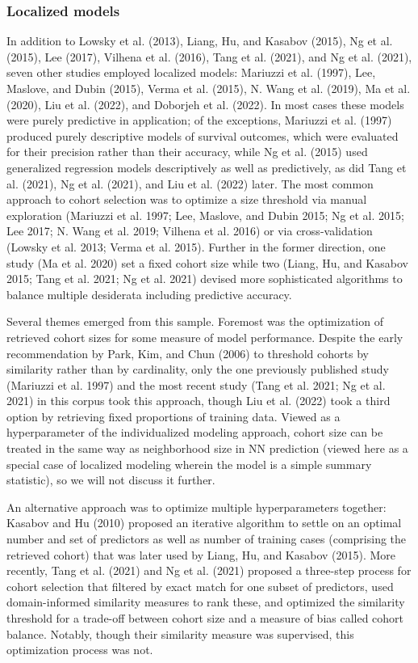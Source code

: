 \documentclass{article}
\begin{document}
\hypertarget{localized-models}{%
\subsubsection{Localized models}\label{localized-models}}

In addition to Lowsky et al. (2013), Liang, Hu, and Kasabov (2015), Ng
et al. (2015), Lee (2017), Vilhena et al. (2016), Tang et al. (2021),
and Ng et al. (2021), seven other studies employed localized models:
Mariuzzi et al. (1997), Lee, Maslove, and Dubin (2015), Verma et al.
(2015), N. Wang et al. (2019), Ma et al. (2020), Liu et al. (2022), and
Doborjeh et al. (2022). In most cases these models were purely
predictive in application; of the exceptions, Mariuzzi et al. (1997)
produced purely descriptive models of survival outcomes, which were
evaluated for their precision rather than their accuracy, while Ng et
al. (2015) used generalized regression models descriptively as well as
predictively, as did Tang et al. (2021), Ng et al. (2021), and Liu et
al. (2022) later. The most common approach to cohort selection was to
optimize a size threshold via manual exploration (Mariuzzi et al. 1997;
Lee, Maslove, and Dubin 2015; Ng et al. 2015; Lee 2017; N. Wang et al.
2019; Vilhena et al. 2016) or via cross-validation (Lowsky et al. 2013;
Verma et al. 2015). Further in the former direction, one study (Ma et
al. 2020) set a fixed cohort size while two (Liang, Hu, and Kasabov
2015; Tang et al. 2021; Ng et al. 2021) devised more sophisticated
algorithms to balance multiple desiderata including predictive accuracy.

Several themes emerged from this sample. Foremost was the optimization
of retrieved cohort sizes for some measure of model performance. Despite
the early recommendation by Park, Kim, and Chun (2006) to threshold
cohorts by similarity rather than by cardinality, only the one
previously published study (Mariuzzi et al. 1997) and the most recent
study (Tang et al. 2021; Ng et al. 2021) in this corpus took this
approach, though Liu et al. (2022) took a third option by retrieving
fixed proportions of training data. Viewed as a hyperparameter of the
individualized modeling approach, cohort size can be treated in the same
way as neighborhood size in NN prediction (viewed here as a special case
of localized modeling wherein the model is a simple summary statistic),
so we will not discuss it further.

An alternative approach was to optimize multiple hyperparameters
together: Kasabov and Hu (2010) proposed an iterative algorithm to
settle on an optimal number and set of predictors as well as number of
training cases (comprising the retrieved cohort) that was later used by
Liang, Hu, and Kasabov (2015). More recently, Tang et al. (2021) and Ng
et al. (2021) proposed a three-step process for cohort selection that
filtered by exact match for one subset of predictors, used
domain-informed similarity measures to rank these, and optimized the
similarity threshold for a trade-off between cohort size and a measure
of bias called cohort balance. Notably, though their similarity measure
was supervised, this optimization process was not.
\end{document}
